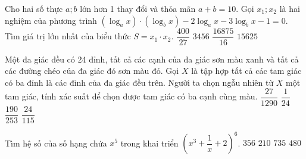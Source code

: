 \begin{ex}%
	Cho hai số thực $a; b$ lớn hơn 1 thay đổi và thỏa mãn $a + b = 10$. Gọi $x_1; x_2$ là hai nghiệm của phương trình $(\log_ax)\cdot (\log_b x) - 2 \log_a x - 3 \log_b x - 1 = 0$. Tìm giá trị lớn nhất của biểu thức $S = x_1 \cdot x_2$.
	\choice
	{$\dfrac{400}{27}$ }
	{\True $3456$}
	{ $\dfrac{16875}{16}$}
	{ $15625$}
\end{ex}
\begin{ex}%
	Một đa giác đều có 24 đỉnh, tất cả các cạnh của đa giác sơn màu xanh và tất cả các đường chéo của đa giác đó sơn màu đỏ. Gọi $X $ là tập hợp tất cả các tam giác có ba đỉnh là các đỉnh của đa giác đều trên. Người ta chọn ngẫu nhiên từ $X$ một tam giác, tính xác suất để chọn được tam giác có ba cạnh cùng màu.
	\choice
	{ $\dfrac{27}{1290}$}
	{ $\dfrac{1}{24}$}
	{\True $\dfrac{190}{253}$}
	{ $\dfrac{24}{115}$}
\end{ex}
\begin{ex}%
	Tìm hệ số của số hạng chứa $x^5$ trong khai triển $\left(x^3 + \dfrac{1}{x}+ 2\right)^6$.
	\choice
	{ $356$}
	{ $210$}
	{ $735$}
	{\True $480$}
\end{ex}
